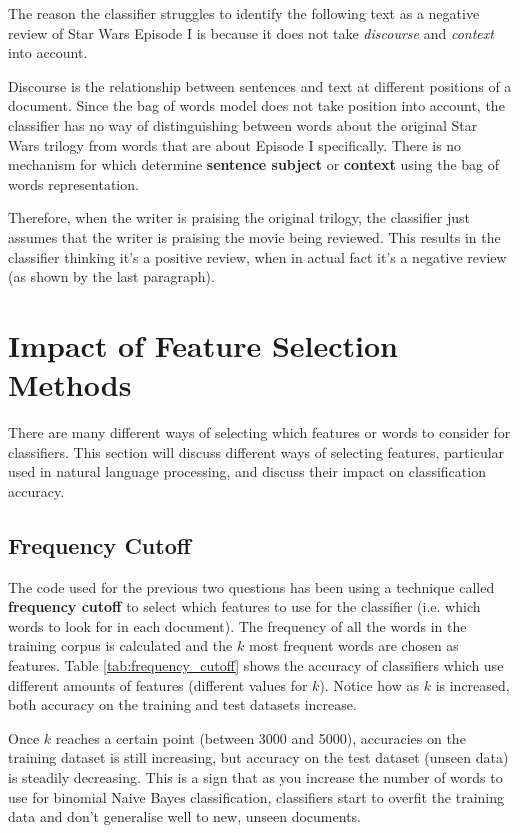 \documentclass{article}
\begin{document}
The reason the classifier struggles to identify the following text as a negative review of Star Wars Episode I is because it does not take \textit{discourse} and \textit{context} into account.

Discourse is the relationship between sentences and text at different positions of a document. Since the bag of words model does not take position into account, the classifier has no way of distinguishing between words about the original Star Wars trilogy from words that are about Episode I specifically. There is no mechanism for which determine \textbf{sentence subject} or \textbf{context} using the bag of words representation.

Therefore, when the writer is praising the original trilogy, the classifier just assumes that the writer is praising the movie being reviewed. This results in the classifier thinking it's a positive review, when in actual fact it's a negative review (as shown by the last paragraph).

\section{Impact of Feature Selection Methods}

There are many different ways of selecting which features or words to consider for classifiers. This section will discuss different ways of selecting features, particular used in natural language processing, and discuss their impact on classification accuracy.

\subsection{Frequency Cutoff}

The code used for the previous two questions has been using a technique called \textbf{frequency cutoff} to select which features to use for the classifier (i.e. which words to look for in each document). The frequency of all the words in the training corpus is calculated and the $k$ most frequent words are chosen as features. Table \ref{tab:frequency_cutoff} shows the accuracy of classifiers which use different amounts of features (different values for $k$). Notice how as $k$ is increased, both accuracy on the training and test datasets increase.

Once $k$ reaches a certain point (between 3000 and 5000), accuracies on the training dataset is still increasing, but accuracy on the test dataset (unseen data) is steadily decreasing. This is a sign that as you increase the number of words to use for binomial Naive Bayes classification, classifiers start to overfit the training data and don't generalise well to new, unseen documents.
\end{document}
